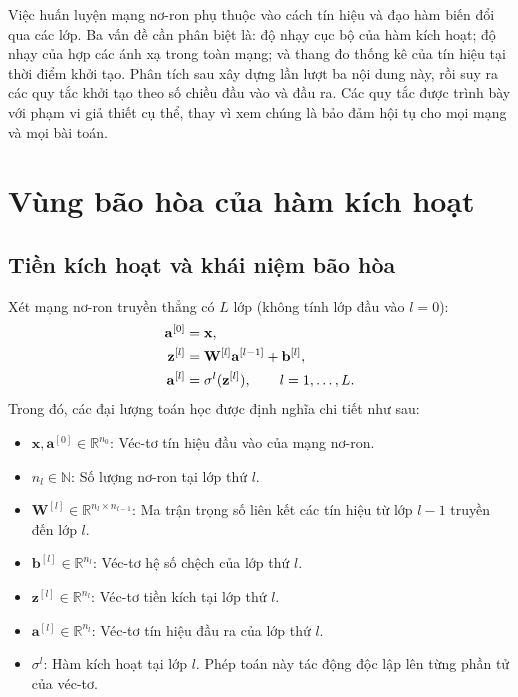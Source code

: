 Việc huấn luyện mạng nơ-ron phụ thuộc vào cách tín hiệu và đạo hàm biến đổi qua các lớp. Ba vấn đề cần phân biệt là: độ nhạy cục bộ của hàm kích hoạt; độ nhạy của hợp các ánh xạ trong toàn mạng; và thang đo thống kê của tín hiệu tại thời điểm khởi tạo. Phân tích sau xây dựng lần lượt ba nội dung này, rồi suy ra các quy tắc khởi tạo theo số chiều đầu vào và đầu ra. Các quy tắc được trình bày
với phạm vi giả thiết cụ thể, thay vì xem chúng là bảo đảm hội tụ cho mọi mạng và mọi bài toán.

\section{Vùng bão hòa của hàm kích hoạt}
\label{kt:sec:bao-hoa}

\subsection{Tiền kích hoạt và khái niệm bão hòa}
Xét mạng nơ-ron truyền thẳng có $L$ lớp (không tính lớp đầu vào $l = 0$):
\begin{align}
    \mathbf a^{[0]}
    &=\mathbf x,\notag\\
    \mathbf z^{[l]}
    &=\mathbf W^{[l]}\mathbf a^{[l-1]}+
    \mathbf b^{[l]},\label{kt:eq:forward-z}\\
    \mathbf a^{[l]}&=\sigma^l(\mathbf z^{[l]}),
    \qquad l=1,\ldots,L.
    \label{kt:eq:forward-a}
\end{align}
Trong đó, các đại lượng toán học được định nghĩa chi tiết như sau:
\begin{itemize}
    \item $\mathbf{x}, \mathbf a^{[0]} \in \mathbb{R}^{n_0}$: Véc-tơ tín hiệu đầu vào của mạng nơ-ron.
    
    \item $n_l \in \mathbb{N}$: Số lượng nơ-ron tại lớp thứ $l$.
    
    \item $\mathbf{W}^{[l]} \in \mathbb{R}^{n_l \times n_{l-1}}$: Ma trận trọng số liên kết các tín hiệu từ lớp $l-1$ truyền đến lớp $l$.
    
    \item $\mathbf{b}^{[l]} \in \mathbb{R}^{n_l}$: Véc-tơ hệ số chệch của lớp thứ $l$.
    
    \item $\mathbf{z}^{[l]} \in \mathbb{R}^{n_l}$: Véc-tơ tiền kích tại lớp thứ $l$.
    
    \item $\mathbf{a}^{[l]} \in \mathbb{R}^{n_l}$: Véc-tơ tín hiệu đầu ra của lớp thứ $l$.
    
    \item $\sigma^l$: Hàm kích hoạt tại lớp $l$. Phép toán này tác động độc lập lên từng phần tử của véc-tơ.
\end{itemize}
